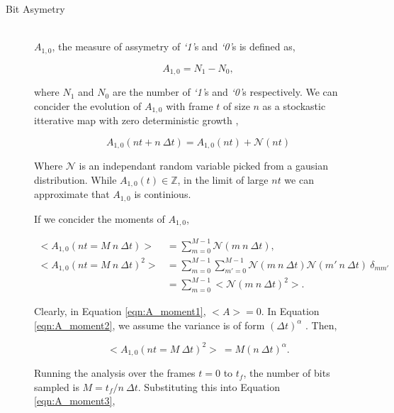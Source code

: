 \begin{description}
				\item[Bit Asymetry] \hfill \\
					
					$A_{1,0}$, the measure of assymetry of \textit{`1'}s and \textit{`0'}s is defined as,

					\begin{equation}
						A_{1,0} = N_1 - N_0,
						\label{eqn:a_def}
					\end{equation}

					where $N_1$ and $N_0$ are the number of \textit{`1'}s and \textit{`0'}s respectively.
					We can concider the evolution of $A_{1,0}$ with frame $t$ of size $n$ as a stockastic itterative map with zero deterministic growth \cite{ref:stockastic_physics},

					\begin{equation}
						A_{1,0}(nt + n\ \Delta t) = A_{1,0}(nt) + \mathcal{N}(nt)
					\end{equation}

					Where $\mathcal{N}$ is an independant random variable picked from a gausian distribution. While $A_{1,0}(t) \in \mathbb{Z}$, in the limit of large $nt$ we can approximate that $A_{1,0}$ is continious. 
					\par
					If we concider the moments of $A_{1,0}$,

					\begin{align}
						\label{eqn:A_moment1}
						<A_{1,0}(nt = M\ n\ \Delta t)> & = \sum_{m = 0}^{M -1}  \mathcal{N}(m\ n\ \Delta t), \\
						\label{eqn:A_moment2}
						<A_{1,0}(nt = M\ n\ \Delta t)^2> & = \sum_{m=0}^{M-1} \sum_{m'=0}^{M-1}  \mathcal{N}(m\ n\ \Delta t) \mathcal{N}(m'\ n\ \Delta t)\ \delta_{mm'} \nonumber \\
						&= \sum_{m=0}^{M-1} < \mathcal{N}(m\ n\ \Delta t)^2 >.
					\end{align}

					Clearly, in Equation \ref{eqn:A_moment1}, $<A> = 0$. In Equation \ref{eqn:A_moment2}, we assume the variance is of form $(\Delta t)^\alpha$ \cite{ref:stockastic_physics}. Then,

					\begin{equation}
						<A_{1,0}(nt = M\ \Delta t)^2>\ = M (n\ \Delta t)^\alpha.
						\label{eqn:A_moment3}
					\end{equation}

					Running the analysis over the frames $t = 0$ to $t_f$, the number of bits sampled is $M = {t_f / n\ \Delta t}$. Substituting this into Equation \ref{eqn:A_moment3},


\end{description}

